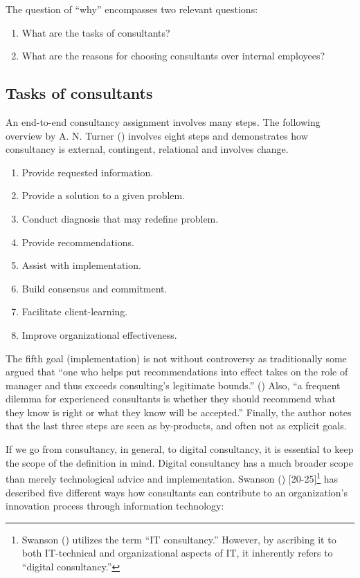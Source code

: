 \documentclass[
  man,floatsintext]{apa6}
\providecommand{\tightlist}{%
  \setlength{\itemsep}{0pt}\setlength{\parskip}{0pt}}
\begin{document}
The question of ``why'' encompasses two relevant questions:

\begin{enumerate}
\def\labelenumi{\arabic{enumi}.}
\tightlist
\item
  What are the tasks of consultants?
\item
  What are the reasons for choosing consultants over internal employees?
\end{enumerate}

\subsection{Tasks of consultants}\label{tasks-of-consultants}

An end-to-end consultancy assignment involves many steps. The following overview by A. N. Turner () involves eight steps and demonstrates how consultancy is external, contingent, relational and involves change.

\begin{enumerate}
\def\labelenumi{\arabic{enumi}.}
\tightlist
\item
  Provide requested information.
\item
  Provide a solution to a given problem.
\item
  Conduct diagnosis that may redefine problem.
\item
  Provide recommendations.
\item
  Assist with implementation.
\item
  Build consensus and commitment.
\item
  Facilitate client-learning.
\item
  Improve organizational effectiveness.
\end{enumerate}

The fifth goal (implementation) is not without controversy as traditionally some argued that ``one who helps put recommendations into effect takes on the role of manager and thus exceeds consulting's legitimate bounds.'' () Also, ``a frequent dilemma for experienced consultants is whether they should recommend what they know is right or what they know will be accepted.'' Finally, the author notes that the last three steps are seen as by-products, and often not as explicit goals.

If we go from consultancy, in general, to digital consultancy, it is essential to keep the scope of the definition in mind. Digital consultancy has a much broader scope than merely technological advice and implementation. Swanson () {[}20-25{]}\footnote{Swanson () utilizes the term ``IT consultancy.'' However, by ascribing it to both IT-technical and organizational aspects of IT, it inherently refers to ``digital consultancy.''} has described five different ways how consultants can contribute to an organization's innovation process through information technology:
\end{document}
